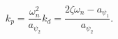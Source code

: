 \begin{subequations}
\begin{equation}
	k_p = \frac{\omega_n^2}{a_{\psi_2}}
\end{equation}
\begin{equation}
	k_d = \frac{2\zeta\omega_n - a_{\psi_1}}{a_{\psi_2}}.
\end{equation}
\end{subequations}

